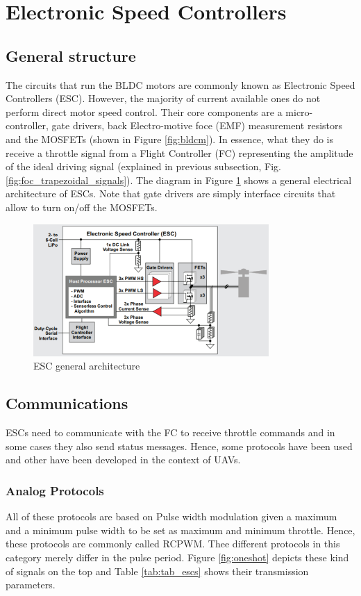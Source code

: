 \section{Electronic Speed Controllers}
\subsection{General structure}
The circuits that run the BLDC motors are commonly known as Electronic Speed Controllers (ESC). However, the majority of current available ones do not perform direct motor speed control. Their core components are a micro-controller, gate drivers, back Electro-motive foce (EMF) measurement resistors and the MOSFETs (shown in Figure \ref{fig:bldcm}). In essence, what they do is receive a throttle signal from a Flight Controller (FC) representing the amplitude of the ideal driving signal (explained in previous subsection, Fig. \ref{fig:foc_trapezoidal_signals}). The diagram in Figure \ref{fig:esc_diag} shows a general electrical architecture of ESCs. Note that gate drivers are simply interface circuits that allow to turn on/off the MOSFETs.
\begin{figure}
    \centering
    \includegraphics[width=0.8\textwidth]{images/esc_diagram.PNG}
    \caption{ESC general architecture \cite{Mogensen_ESC_Motor_Control2016}}
    \label{fig:esc_diag}
\end{figure}

\subsection{Communications}
ESCs need to communicate with the FC to receive throttle commands and in some cases they also send status messages. Hence, some protocols have been used and other have been developed in the context of UAVs.

\subsubsection{Analog Protocols}
All of these protocols are based on Pulse width modulation given a maximum and a minimum pulse width to be set as maximum and minimum throttle. Hence, these protocols are commonly called RCPWM. Thee different protocols in this category merely differ in the pulse period. Figure \ref{fig:oneshot} depicts these kind of signals on the top and Table \ref{tab:tab_escs}  shows their transmission parameters.

